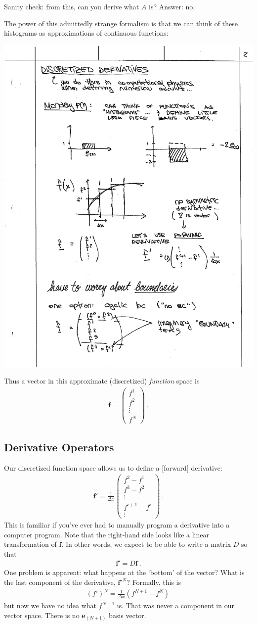 \documentclass[12pt]{article}
\numberwithin{equation}{section}    %
\renewcommand{\vec}[1]{\mathbf{#1}} %
\begin{document}
Sanity check: from this, can you derive what $A$ is? Answer: no. 

The power of this admittedly strange formalism is that we can think of these histograms as approximations of continuous functions:

\begin{center}
\includegraphics[width=.4\textwidth]{figures/lec02_histfun.pdf}
\end{center}

Thus a vector in this approximate (discretized) \emph{function} space is 
\begin{align}
  \vec{f} = 
  \begin{pmatrix}
    f^1 \\
    f^2 \\
    \vdots\\
    f^N
  \end{pmatrix} \ .
\end{align}

\subsection{Derivative Operators}

Our discretized function space allows us to define a [forward] derivative:
\begin{align}
  \vec{f'} =
  \frac{1}{\Delta x}
  \begin{pmatrix}
    f^2 - f^1 \\
    f^3 - f^2 \\
    \vdots
    \\
    f^{i+1}-f^i
    \\
    \vdots
  \end{pmatrix} \ .
\end{align}
This is familiar if you’ve ever had to manually program a derivative into a computer program. Note that the right-hand side looks like a linear transformation of $\vec{f}$. In other words, we expect to be able to write a matrix $D$ so that
\begin{align}
  \vec{f'} = D\vec{f} \ .
\end{align}
One problem is apparent: what happens at the `bottom’ of the vector? What is the last component of the derivative, $\vec{f'}^N$? Formally, this is
\begin{align}
  {(f')}^N = \frac{1}{\Delta x}(f^{N+1} - f^N) \,
\end{align}
but now we have no idea what $f^{N+1}$ is. That was never a component in our vector space. There is no $\vec{e}_{(N+1)}$ basis vector. 
\end{document}
